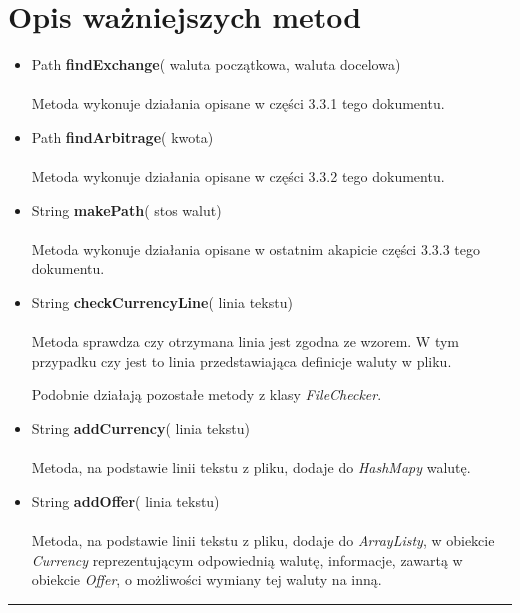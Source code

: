 \documentclass[a4paper,11pt]{article}
\newcommand{\linia}{\rule{\linewidth}{0.4mm}}
\begin{document}
\section{Opis ważniejszych metod}
\begin{itemize}
\item Path \textbf{findExchange}( waluta początkowa, waluta docelowa)
\\\\
Metoda wykonuje działania opisane w części 3.3.1 tego dokumentu.
\item Path \textbf{findArbitrage}( kwota)
\\\\
Metoda wykonuje działania opisane w części 3.3.2 tego dokumentu.
\item String \textbf{makePath}( stos walut)
\\\\
Metoda wykonuje działania opisane w ostatnim akapicie części 3.3.3 tego dokumentu.
\item String \textbf{checkCurrencyLine}( linia tekstu)
\\\\
Metoda sprawdza czy otrzymana linia jest zgodna ze wzorem. W tym przypadku czy jest to linia przedstawiająca definicje waluty w pliku.

Podobnie działają pozostałe metody z klasy \textit{FileChecker}.
\item String \textbf{addCurrency}( linia tekstu)
\\\\
Metoda, na podstawie linii tekstu z pliku, dodaje do \textit{HashMapy} walutę.
\item String \textbf{addOffer}(  linia tekstu)
\\\\
Metoda, na podstawie linii tekstu z pliku, dodaje do \textit{ArrayListy}, w obiekcie \textit{Currency} reprezentującym odpowiednią walutę, informacje, zawartą w obiekcie  \textit{Offer}, o możliwości wymiany tej waluty na inną.

\end{itemize}

\noindent\linia
\end{document}
